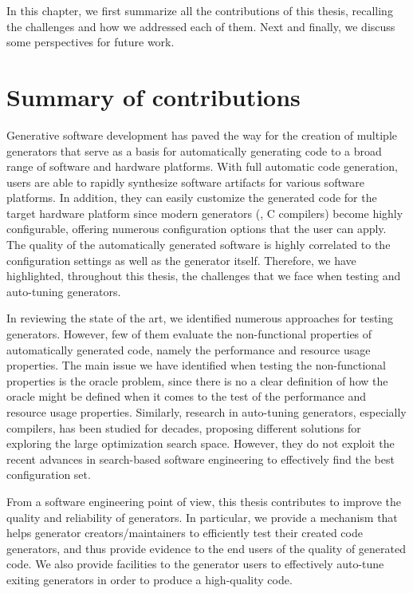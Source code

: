 In this chapter, we first summarize all the contributions of this thesis, recalling the challenges and how we addressed each of them. Next and finally, we discuss some perspectives for future work.

\section{Summary of contributions}
Generative software development has paved the way for the creation of multiple generators that serve as a basis for automatically generating code to a broad range of software and hardware platforms. With full automatic code generation, users are able to rapidly synthesize software artifacts for various software platforms. In addition, they can easily customize the generated code for the target hardware platform since modern generators (\ie, C compilers) become highly configurable, offering numerous configuration options that the user can apply. 
The quality of the automatically generated software is highly correlated to the configuration settings as well as the generator itself.
Therefore, we have highlighted, throughout this thesis, the challenges that we face when testing and auto-tuning generators. 

In reviewing the state of the art, we identified numerous approaches for testing generators. However, few of them evaluate the non-functional properties of automatically generated code, namely the performance and resource usage properties. The main issue we have identified when testing the non-functional properties is the oracle problem, since there is no a clear definition of how the oracle might be defined when it comes to the test of the performance and resource usage properties. Similarly, research in auto-tuning generators, especially compilers, has been studied for decades, proposing different solutions for exploring the large optimization search space. However, they  do not exploit the recent advances in search-based software engineering to effectively find the best configuration set. 
 

From a software engineering point of view, this thesis contributes to improve the quality and reliability of generators. In particular, we provide a mechanism that helps generator creators/maintainers to efficiently test their created code generators, and thus provide evidence to the end users of the quality of generated code. We also provide facilities to the generator users to effectively auto-tune exiting generators in order to produce a high-quality code.

